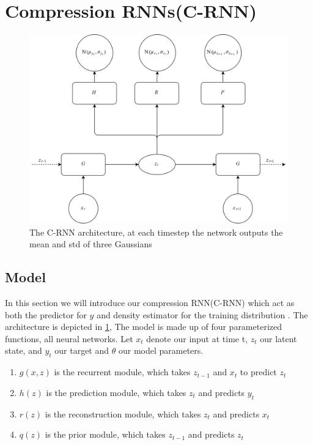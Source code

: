 \documentclass[../main.tex]{subfiles}
\begin{document}



\section{Compression RNNs(C-RNN)}
\label{sec:model}

\begin{figure}
    \centering
    \includegraphics[width=\textwidth]{Approach/rnn_architecture.png}
    \caption[C-RNN architecture]{The C-RNN architecture, at each timestep the network outputs the mean and std of three Gaussians}
     \label{fig:architecture}
\end{figure}


\subsection{Model}

In this section we will introduce our compression RNN(C-RNN) which act as both the predictor for $y$ and density estimator for the training distribution . 
The architecture is depicted in \cref{fig:architecture}, The model is made up of four parameterized functions, all neural networks. Let $x_t$ denote our input at time t, $z_t$ our latent state, and $y_t$ our target and $\theta$ our model parameters.
\begin{enumerate}
    \item $g(x, z)$ is the recurrent module, which takes $z_{t-1}$ and $x_t$ to predict $z_t$
    \item $h(z)$ is the prediction module, which takes $z_t$ and predicts $y_t$
    \item $r(z)$ is the reconstruction module, which takes $z_t$ and predicts $x_t$
    \item $q(z)$ is the prior module, which takes $z_{t-1}$ and predicts $z_t$
\end{enumerate}
\end{document}
